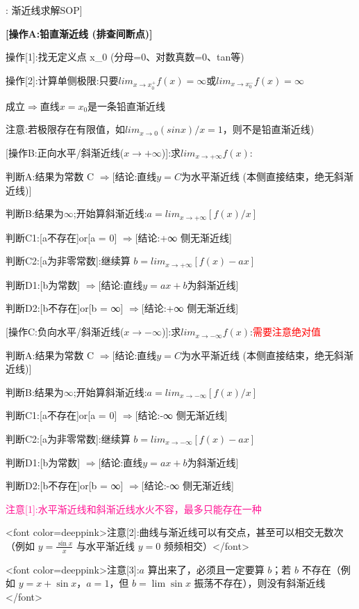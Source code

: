 \documentclass[11pt,a4paper,UTF8]{ctexart}
\begin{document}
\begin{thmbox}[原理[2]: 渐近线求解SOP]

\textbf{[操作A:铅直渐近线 (排查间断点)]}

操作[1]:找无定义点 x\_0 (分母=0、对数真数=0、tan等)

操作[2]:计算单侧极限:只要$lim_{x\rightarrow x_0^+} f(x) = ∞ $或$ lim_{x\rightarrow x_0^-} f(x) = ∞$

	成立$\Rightarrow$直线$ x = x_0 $是一条铅直渐近线

注意:若极限存在有限值，如$lim_{x\rightarrow0} (sin x)/x = 1$，则不是铅直渐近线)

\textit{}[操作B:正向水平/斜渐近线($x \rightarrow +∞$)]:求$lim_{x\rightarrow+∞} f(x)$:\textit{}

判断A:结果为常数 C 				    $\Rightarrow$[结论:直线$y = C $为水平渐近线 (本侧直接结束，绝无斜渐近线)]

判断B:结果为$∞$;开始算斜渐近线:$a = lim_{x\rightarrow+∞}[f(x) / x]$

     判断C1:[a不存在]or[a = 0]			 $\Rightarrow$[结论:+∞ 侧无渐近线]

     判断C2:[a为非零常数]:继续算 $b = lim_{x\rightarrow+∞}[f(x) - ax]$

            判断D1:[b为常数]  			$\Rightarrow$[结论:直线$y = ax + b $为斜渐近线]

            判断D2:[b不存在]or[b = ∞] 		$\Rightarrow$[结论:+∞ 侧无渐近线]

\textit{}[操作C:负向水平/斜渐近线($x \rightarrow -∞$)]:求$lim_{x\rightarrow-∞} f(x)$:\textit{}\textcolor{red}{需要注意绝对值}

判断A:结果为常数 C 				    $\Rightarrow$[结论:直线$y = C $为水平渐近线 (本侧直接结束，绝无斜渐近线)]

判断B:结果为$∞$;开始算斜渐近线:$a = lim_{x\rightarrow-∞}[f(x) / x]$

     判断C1:[a不存在]or[a = 0]			 $\Rightarrow$[结论:-∞ 侧无渐近线]

     判断C2:[a为非零常数]:继续算 $b = lim_{x\rightarrow-∞}[f(x) - ax]$

            判断D1:[b为常数]  			$\Rightarrow$[结论:直线$y = ax + b $为斜渐近线]

            判断D2:[b不存在]or[b = ∞] 		$\Rightarrow$[结论:-∞ 侧无渐近线]

\textcolor{DeepPink}{注意[1]:水平渐近线和斜渐近线水火不容，最多只能存在一种}

<font color=deeppink>注意[2]:曲线与渐近线可以有交点，甚至可以相交无数次（例如 $y = \frac{\sin x}{x}$ 与水平渐近线 $y = 0$ 频频相交）</font>

<font color=deeppink>注意[3]:$a$ 算出来了，必须且一定要算 $b$；若 $b$ 不存在（例如 $y = x + \sin x$，$a = 1$，但 $b = \lim \sin x$ 振荡不存在），则没有斜渐近线</font>

\end{thmbox}
\end{document}
